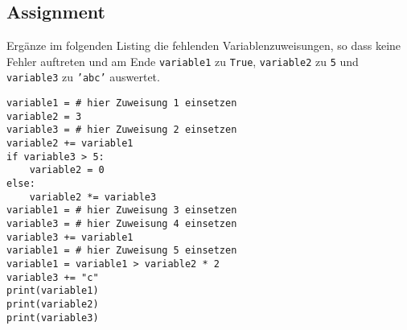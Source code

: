 \subsection{Assignment}
Ergänze im folgenden Listing die fehlenden Variablenzuweisungen, so dass keine Fehler auftreten und am Ende \texttt{variable1} zu \texttt{True}, \texttt{variable2} zu \texttt{5} und \texttt{variable3} zu \texttt{'abc'} auswertet.
\begin{lstlisting}
variable1 = # hier Zuweisung 1 einsetzen
variable2 = 3
variable3 = # hier Zuweisung 2 einsetzen
variable2 += variable1
if variable3 > 5:
	variable2 = 0
else:
	variable2 *= variable3
variable1 = # hier Zuweisung 3 einsetzen
variable3 = # hier Zuweisung 4 einsetzen
variable3 += variable1
variable1 = # hier Zuweisung 5 einsetzen
variable1 = variable1 > variable2 * 2
variable3 += "c"
print(variable1)
print(variable2)
print(variable3)
\end{lstlisting}
